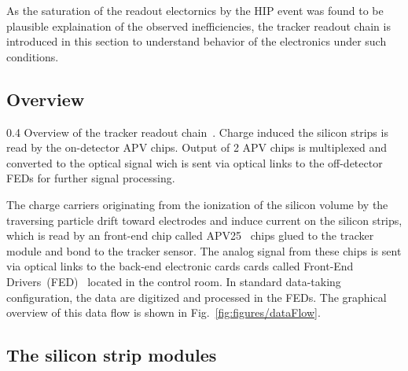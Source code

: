 As the saturation of the readout electornics by the HIP event was found to be plausible explaination of the observed inefficiencies, the tracker readout chain is introduced in this section to understand behavior of the electronics under such conditions.


\subsection{Overview}

                 {0.4}       %
                 {Overview of the tracker readout chain~\cite{Bainbridge:2004jc}. Charge induced the silicon strips is read by the on-detector APV chips. Output of 2 APV chips is multiplexed and converted to the optical signal wich is sent via optical links to the off-detector FEDs for further signal processing. } %

The charge carriers originating from the ionization of the silicon volume by the traversing particle drift toward electrodes and induce current on the silicon strips, which is read by an front-end chip called APV25~\cite{French:2001xb} chips glued to the tracker module and bond to the tracker sensor. The analog signal from these chips is sent via optical links to the back-end electronic cards cards called Front-End Drivers~(FED)~\cite{Baird:2002wg} located in the control room. In standard data-taking configuration, the data are digitized and processed in the FEDs. The graphical overview of this data flow is shown in Fig.~\ref{fig:figures/dataFlow}.

\subsection{The silicon strip modules}


